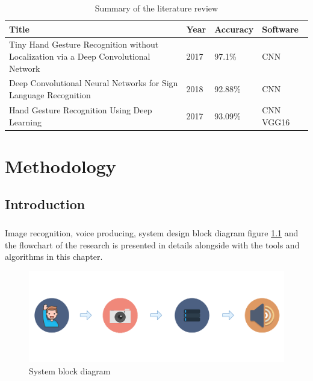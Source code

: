 \documentclass[12pt]{report}
\begin{document}
                    \begin{center}
                        \begin{table}[h]
                            \caption{Summary of the literature review}
                            \begin{tabular}{ |p{7cm}|p{2cm}|p{2cm}|p{3cm}| }
                                \hline
                                Title & Year & Accuracy & Software\\
                                \hline
                                Tiny Hand Gesture Recognition without Localization via a Deep Convolutional Network & 2017 & 97.1\%& CNN \\
                                \hline
                                Deep Convolutional Neural Networks for Sign Language Recognition & 2018 & 92.88\% & CNN \\
                                \hline
                                Hand Gesture Recognition Using Deep Learning & 2017 & 93.09\% & CNN VGG16 \\
                                \hline
                            \end{tabular}
                            \label{table:summary}
                        \end{table}
                    \end{center}
        \newpage

    \chapter{Methodology}
        \section{Introduction}
        \paragraph{}
            Image recognition, voice producing, system design block diagram figure \ref{fig:system_diagram} 
            and the flowchart of the research is presented in details alongside with the tools
            and algorithms in this chapter.
            
            \begin{figure}[h]
                \centering
                \includegraphics[width=\textwidth]{./images/system_diagram.png}
                \caption{System block diagram}
                \label{fig:system_diagram}
            \end{figure}
        
\end{document}

